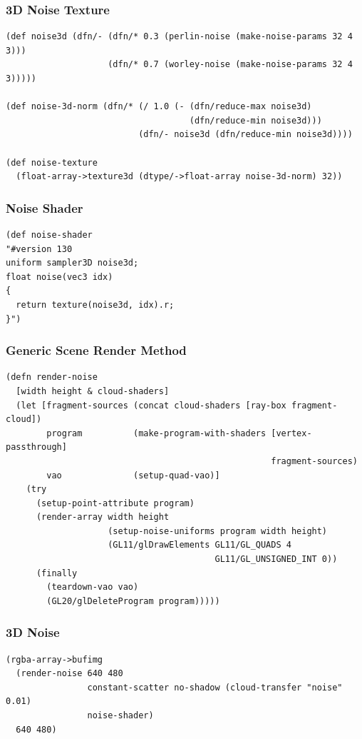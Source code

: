 \documentclass[aspectratio=169,11pt,xcolor=dvipsnames]{beamer}
\begin{document}
\begin{frame}[fragile]
  \frametitle{3D Noise Texture}
  \begin{verbatim}
(def noise3d (dfn/- (dfn/* 0.3 (perlin-noise (make-noise-params 32 4 3)))
                    (dfn/* 0.7 (worley-noise (make-noise-params 32 4 3)))))

(def noise-3d-norm (dfn/* (/ 1.0 (- (dfn/reduce-max noise3d)
                                    (dfn/reduce-min noise3d)))
                          (dfn/- noise3d (dfn/reduce-min noise3d))))

(def noise-texture
  (float-array->texture3d (dtype/->float-array noise-3d-norm) 32))
  \end{verbatim}
\end{frame}

\begin{frame}[fragile]
  \frametitle{Noise Shader}
  \begin{verbatim}
(def noise-shader
"#version 130
uniform sampler3D noise3d;
float noise(vec3 idx)
{
  return texture(noise3d, idx).r;
}")
  \end{verbatim}
\end{frame}

\begin{frame}[fragile]
  \frametitle{Generic Scene Render Method}
  \begin{verbatim}
(defn render-noise
  [width height & cloud-shaders]
  (let [fragment-sources (concat cloud-shaders [ray-box fragment-cloud])
        program          (make-program-with-shaders [vertex-passthrough] 
                                                    fragment-sources)
        vao              (setup-quad-vao)]
    (try
      (setup-point-attribute program)
      (render-array width height
                    (setup-noise-uniforms program width height)
                    (GL11/glDrawElements GL11/GL_QUADS 4
                                         GL11/GL_UNSIGNED_INT 0))
      (finally
        (teardown-vao vao)
        (GL20/glDeleteProgram program)))))
  \end{verbatim}
\end{frame}

\begin{frame}[fragile]
  \frametitle{3D Noise}
  \begin{verbatim}
(rgba-array->bufimg
  (render-noise 640 480
                constant-scatter no-shadow (cloud-transfer "noise" 0.01)
                noise-shader)
  640 480)
  \end{verbatim}
\end{frame}
\end{document}
